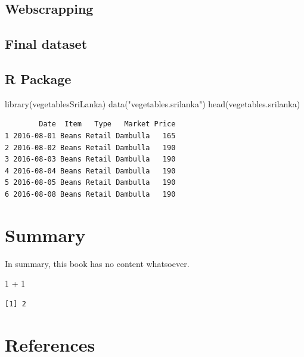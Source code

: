 \documentclass[
  letterpaper,
  DIV=11,
  numbers=noendperiod]{scrreprt}
\newenvironment{Shaded}{\begin{snugshade}}{\end{snugshade}}
\newcommand{\DecValTok}[1]{\textcolor[rgb]{0.68,0.00,0.00}{#1}}
\newcommand{\FunctionTok}[1]{\textcolor[rgb]{0.28,0.35,0.67}{#1}}
\newcommand{\NormalTok}[1]{\textcolor[rgb]{0.00,0.23,0.31}{#1}}
\newcommand{\SpecialCharTok}[1]{\textcolor[rgb]{0.37,0.37,0.37}{#1}}
\newcommand{\StringTok}[1]{\textcolor[rgb]{0.13,0.47,0.30}{#1}}
\newlength{\cslhangindent}
\newenvironment{CSLReferences}[2] %
 {\begin{list}{}{%
  \setlength{\itemindent}{0pt}
  \setlength{\leftmargin}{0pt}
  \setlength{\parsep}{0pt}
  \ifodd #1
   \setlength{\leftmargin}{\cslhangindent}
   \setlength{\itemindent}{-1\cslhangindent}
  \fi
  \setlength{\itemsep}{#2\baselineskip}}}
 {\end{list}}
\begin{document}
\section{Webscrapping}\label{webscrapping}

\section{Final dataset}\label{final-dataset}

\section{R Package}\label{r-package}

\begin{Shaded}
\begin{Highlighting}[]
\FunctionTok{library}\NormalTok{(vegetablesSriLanka)}
\FunctionTok{data}\NormalTok{(}\StringTok{"vegetables.srilanka"}\NormalTok{)}
\FunctionTok{head}\NormalTok{(vegetables.srilanka)}
\end{Highlighting}
\end{Shaded}

\begin{verbatim}
        Date  Item   Type   Market Price
1 2016-08-01 Beans Retail Dambulla   165
2 2016-08-02 Beans Retail Dambulla   190
3 2016-08-03 Beans Retail Dambulla   190
4 2016-08-04 Beans Retail Dambulla   190
5 2016-08-05 Beans Retail Dambulla   190
6 2016-08-08 Beans Retail Dambulla   190
\end{verbatim}


\chapter{Summary}\label{summary}

In summary, this book has no content whatsoever.

\begin{Shaded}
\begin{Highlighting}[]
\DecValTok{1} \SpecialCharTok{+} \DecValTok{1}
\end{Highlighting}
\end{Shaded}

\begin{verbatim}
[1] 2
\end{verbatim}


\chapter*{References}\label{references}


\label{refs}
\begin{CSLReferences}{0}{1}
\end{CSLReferences}
\end{document}
